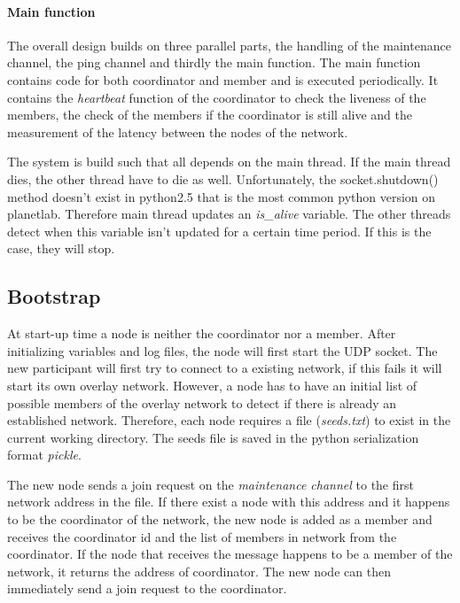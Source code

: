 \documentclass[paper=a4, fontsize=11pt]{scrartcl} %
\numberwithin{equation}{section} %
\numberwithin{figure}{section} %
\numberwithin{table}{section} %
\begin{document}
\paragraph{Main function}
The overall design builds on three parallel parts, the handling of the maintenance channel, the ping channel and thirdly the main function. The main function contains code for both coordinator and member and is executed periodically. It contains the \textit{heartbeat} function of the coordinator to check the liveness of the members, the check of the members if the coordinator is still alive and the measurement of the latency between the nodes of the network.

The system is build such that all depends on the main thread. If the main thread dies, the other thread have to die as well. Unfortunately, the socket.shutdown() method doesn't exist in python2.5 that is the most common python version on planetlab. Therefore main thread updates an \textit{is\_alive} variable. The other threads detect when this variable isn't updated for a certain time period. If this is the case, they will stop.


\subsection{Bootstrap}

At start-up time a node is neither the coordinator nor a member. After initializing variables and log files, the node will first start the UDP socket. The new participant will first try to connect to a existing network, if this fails it will start its own overlay network. However, a node has to have an initial list of possible members of the overlay network to detect if there is already an established network. Therefore, each node requires a file (\textit{seeds.txt}) to exist in the current working directory. The seeds file is saved in the python serialization format \textit{pickle}.

The new node sends a join request on the \textit{maintenance channel} to the first network address in the file. If there exist a node with this address and it happens to be the coordinator of the network, the new node is added as a member and receives the coordinator id and the list of members in network from the coordinator. If the node that receives the message happens to be a member of the network, it returns the address of coordinator. The new node can then immediately send a join request to the coordinator.
\end{document}
